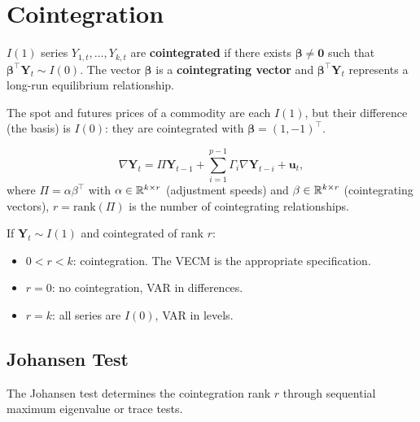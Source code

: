 \section{Cointegration}

\begin{definition}[Cointegration]
$I(1)$ series $Y_{1,t},\ldots,Y_{k,t}$ are \textbf{cointegrated} if there exists $\bm\beta\neq\bm{0}$ such that $\bm\beta^\top\bm{Y}_t\sim I(0)$. The vector $\bm\beta$ is a \textbf{cointegrating vector} and $\bm\beta^\top\bm{Y}_t$ represents a long-run equilibrium relationship.
\end{definition}

\begin{example}
The spot and futures prices of a commodity are each $I(1)$, but their difference (the basis) is $I(0)$: they are cointegrated with $\bm\beta=(1,-1)^\top$.
\end{example}

\begin{definition}
\[
\nabla\bm{Y}_t = \Pi\bm{Y}_{t-1} + \sum_{i=1}^{p-1}\Gamma_i\nabla\bm{Y}_{t-i} + \bm{u}_t,
\]
where $\Pi=\alpha\beta^\top$ with $\alpha\in\mathbb{R}^{k\times r}$ (adjustment speeds) and $\beta\in\mathbb{R}^{k\times r}$ (cointegrating vectors), $r=\mathrm{rank}(\Pi)$ is the number of cointegrating relationships.
\end{definition}

\begin{theorem}
If $\bm{Y}_t\sim I(1)$ and cointegrated of rank $r$:
\begin{itemize}
\item $0<r<k$: cointegration. The VECM is the appropriate specification.
\item $r=0$: no cointegration, VAR in differences.
\item $r=k$: all series are $I(0)$, VAR in levels.
\end{itemize}
\end{theorem}

\subsection{Johansen Test}

\begin{definition}
The Johansen test determines the cointegration rank $r$ through sequential maximum eigenvalue or trace tests.
\end{definition}

